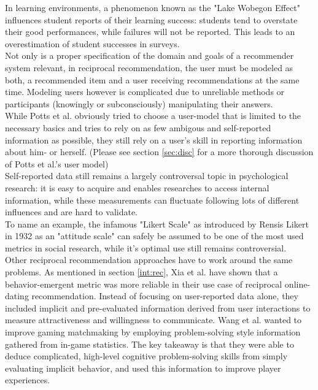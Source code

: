 \documentclass[nochapterpage,bigchapter,linedtoc,longdoc,colorback,accentcolor=tud3b,oneside]{tudreport}
\begin{document}
In learning environments, a phenomenon known as the "Lake Wobegon Effect" influences student reports of their learning success: students tend to overstate their good performances, while failures will not be reported. This leads to an overestimation of student successes in surveys. \cite{maxwell1994lake}\\
Not only is a proper specification of the domain and goals of a recommender system relevant, in reciprocal recommendation, the user must be modeled as both, a recommended item and a user receiving recommendations at the same time. Modeling users however is complicated due to unreliable methods or participants (knowingly or subconsciously) manipulating their answers.\\
While Potts et al. obviously tried to choose a user-model that is limited to the necessary basics and tries to rely on as few ambigous and self-reported information as possible, they still rely on a user's skill in reporting information about him- or herself. (Please see section \ref{sec:disc} for a more thorough discussion of Potts et al.'s user model)\\
Self-reported data still remains a largely controversal topic in psychological research: it is easy to acquire and enables researches to access internal information,  while these measurements can fluctuate following lots of different influences and are hard to validate. \cite{gonyea2005self, lee2002cultural, sorensen2008measuring}\\
To name an example, the infamous "Likert Scale" as introduced by Rensis Likert in 1932 as an "attitude scale" \cite{likert1932technique} can safely be assumed to be one of the most used metrics in social research, while it's optimal use still remains controversial. \cite{chang1994psychometric, lee2002cultural}\\
Other reciprocal recommendation approaches have to work around the same problems. As mentioned in section \ref{int:rec}, Xia et al. have shown that a behavior-emergent metric was more reliable in their use case of reciprocal online-dating recommendation. \cite{xia2014characterization} Instead of focusing on user-reported data alone, they included implicit and pre-evaluated information derived from user interactions to measure attractiveness and willingness to communicate. \cite{xia2015reciprocal} Wang et al. wanted to improve gaming matchmaking by employing problem-solving style information gathered from in-game statistics. The key takeaway is that they were able to deduce complicated, high-level cognitive problem-solving skills from simply evaluating implicit behavior, and used this information to improve player experiences.\\
\end{document}
